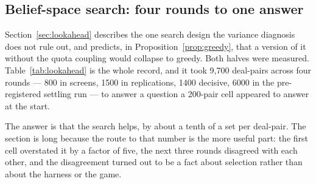 \documentclass[11pt,a4paper]{article}
\begin{document}
\subsection{Belief-space search: four rounds to one answer}
\label{sec:res-lookahead}

Section~\ref{sec:lookahead} describes the one search design the variance
diagnosis does not rule out, and predicts, in Proposition~\ref{prop:greedy},
that a version of it without the quota coupling would collapse to greedy. Both
halves were measured. Table~\ref{tab:lookahead} is the whole record, and it took
9{,}700 deal-pairs across four rounds --- 800 in screens, 1500 in replications,
1400 decisive, 6000 in the pre-registered settling run --- to answer a question
a 200-pair cell appeared to answer at the start.

The answer is that the search helps, by about a tenth of a set per deal-pair.
The section is long because the route to that number is the more useful part:
the first cell overstated it by a factor of five, the next three rounds
disagreed with each other, and the disagreement turned out to be a fact about
selection rather than about the harness or the game.
\end{document}
